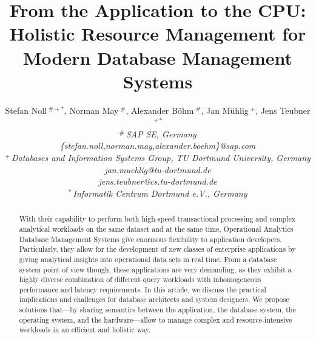 \documentclass[11pt,dvipdfm]{article}
\begin{document}
\title{From the Application to the CPU: Holistic Resource Management for Modern Database Management Systems}
\author{%
{Stefan Noll{\small$~^{\#+*}$}, Norman May{\small$~^{\#}$}, Alexander B\"{o}hm{\small$~^{\#}$}, Jan M\"{u}hlig$~^{+}$, Jens Teubner{\small$~^{+*}$} }
\vspace{1.2mm}\\
\fontsize{10}{10}\selectfont\rmfamily\itshape
$^{\#}$\,SAP SE, Germany\\
\fontsize{9}{9}\selectfont\ttfamily\upshape
\{stefan.noll,norman.may,alexander.boehm\}@sap.com
\vspace{1.6mm}\\
\fontsize{10}{10}\selectfont\itshape
$^{+}$\,Databases and Information Systems Group, TU Dortmund University, Germany\\
\fontsize{9}{9}\selectfont\ttfamily\upshape
jan.muehlig@tu-dortmund.de\\
\fontsize{9}{9}\selectfont\ttfamily\upshape
jens.teubner@cs.tu-dortmund.de
\vspace{1.6mm}\\
\fontsize{10}{10}\selectfont\itshape
$^{*}$\,Informatik Centrum Dortmund e.V., Germany
}
\maketitle

\begin{abstract}
With their capability to perform both high-speed transactional processing and complex analytical workloads on the same dataset and at the same time, Operational Analytics Database Management Systems give enormous flexibility to application developers.
Particularly, they allow for the development of new classes of enterprise applications by giving analytical insights into operational data sets in real time.
From a database system point of view though, these applications are very demanding, as they exhibit a highly diverse combination of  different query workloads with inhomogeneous performance and latency requirements.
In this article, we discuss the practical implications and challenges for database architects and system designers. We propose solutions that---by sharing semantics between the application, the database system, the operating system, and the hardware---allow to manage complex and resource-intensive workloads in an efficient and holistic way.
\end{abstract}
\end{document}
